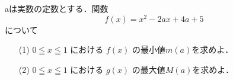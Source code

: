 \documentclass[8pt,dvipdfmx]{article}
\begin{document}
\begin{tcolorbox}[title=数学\textcircled{1} 1-4 A]
aは実数の定数とする．関数
\[
f(x) = x^2 - 2ax + 4a + 5
\]
について
\begin{enumerate}
    \item[(1)] \(0 \leqq x \leqq 1\) における \(f(x)\) の最小値\(m(a)\)を求めよ．
    \vspace{2mm} %
    \item[(2)] \(0 \leqq x \leqq 1\) における \(g(x)\) の最大値\(M(a)\)を求めよ．
\end{enumerate}
\end{tcolorbox}

\end{document}
